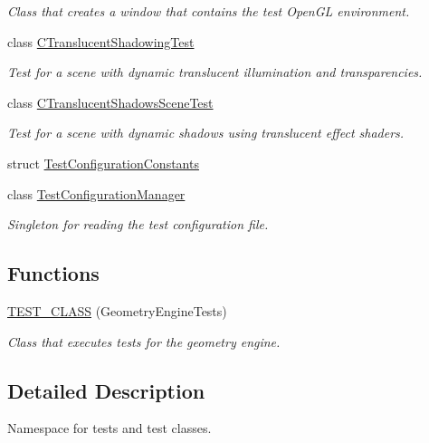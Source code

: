 \begin{DoxyCompactItemize}
\begin{DoxyCompactList}\small\item\em Class that creates a window that contains the test Open\+GL environment. \end{DoxyCompactList}\item 
class \mbox{\hyperlink{class_unit_test_1_1_c_translucent_shadowing_test}{C\+Translucent\+Shadowing\+Test}}
\begin{DoxyCompactList}\small\item\em Test for a scene with dynamic translucent illumination and transparencies. \end{DoxyCompactList}\item 
class \mbox{\hyperlink{class_unit_test_1_1_c_translucent_shadows_scene_test}{C\+Translucent\+Shadows\+Scene\+Test}}
\begin{DoxyCompactList}\small\item\em Test for a scene with dynamic shadows using translucent effect shaders. \end{DoxyCompactList}\item 
struct \mbox{\hyperlink{struct_unit_test_1_1_test_configuration_constants}{Test\+Configuration\+Constants}}
\item 
class \mbox{\hyperlink{class_unit_test_1_1_test_configuration_manager}{Test\+Configuration\+Manager}}
\begin{DoxyCompactList}\small\item\em Singleton for reading the test configuration file. \end{DoxyCompactList}\end{DoxyCompactItemize}
\subsection*{Functions}
\begin{DoxyCompactItemize}
\item 
\mbox{\hyperlink{namespace_unit_test_aa27c1a34f019a757474599d420492bf6}{T\+E\+S\+T\+\_\+\+C\+L\+A\+SS}} (Geometry\+Engine\+Tests)
\begin{DoxyCompactList}\small\item\em Class that executes tests for the geometry engine. \end{DoxyCompactList}\end{DoxyCompactItemize}


\subsection{Detailed Description}
Namespace for tests and test classes. 

